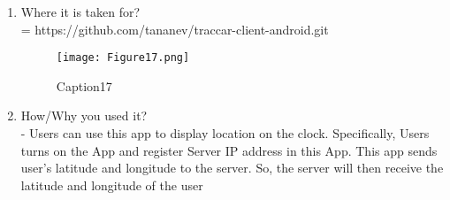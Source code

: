 \documentclass[10pt,a4paper,twocolumn]{report}
\begin{document}
\begin{enumerate}
		\item Where it is taken for? \\
		= https://github.com/tananev/traccar-client-android.git \\
		\begin{figure}
				\texttt{[image: Figure17.png]}
				\caption{Caption17}
				\label{fig17}
		\end{figure}
		
		\item How/Why you used it? \\
		- Users can use this app to display location on the clock. Specifically, Users turns on the App and register Server IP address in this App. This app sends user’s latitude and longitude to the server. So, the server will then receive the latitude and longitude of the user \\
		\end{enumerate}
\end{document}
